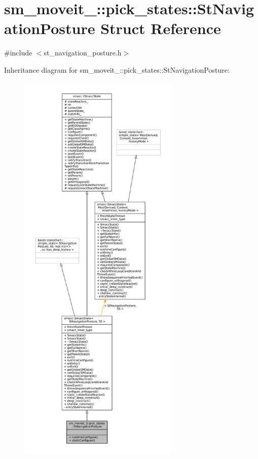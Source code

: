 \hypertarget{structsm__moveit__3_1_1pick__states_1_1StNavigationPosture}{}\section{sm\+\_\+moveit\+\_\+:\+:pick\+\_\+states\+:\+:St\+Navigation\+Posture Struct Reference}
\label{structsm__moveit__3_1_1pick__states_1_1StNavigationPosture}


{\ttfamily \#include $<$st\+\_\+navigation\+\_\+posture.\+h$>$}



Inheritance diagram for sm\+\_\+moveit\+\_\+:\+:pick\+\_\+states\+:\+:St\+Navigation\+Posture\+:
\nopagebreak
\begin{figure}[H]
\begin{center}
\leavevmode
\includegraphics[height=550pt]{structsm__moveit__3_1_1pick__states_1_1StNavigationPosture__inherit__graph}
\end{center}
\end{figure}


